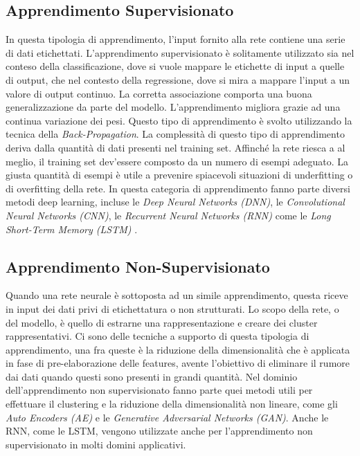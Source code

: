 \subsection{Apprendimento Supervisionato}
In questa tipologia di apprendimento, l'input fornito alla rete contiene una 
serie di dati etichettati. L'apprendimento supervisionato è solitamente 
utilizzato sia nel conteso della classificazione, dove  si vuole mappare le 
etichette di input a quelle di output, che nel contesto della regressione, 
dove si mira a mappare l'input a un valore di output continuo. La corretta 
associazione comporta una buona generalizzazione da parte del modello. 
L'apprendimento migliora grazie ad una continua variazione dei pesi. Questo 
tipo di apprendimento è svolto utilizzando la tecnica della \emph{Back-Propagation}. 
La complessità di questo tipo di apprendimento deriva dalla quantità di dati 
presenti nel training set. Affinché la rete riesca a  al meglio, il training set 
dev'essere composto da un numero di esempi adeguato. La giusta quantità di 
esempi è utile a prevenire spiacevoli situazioni di underfitting o di overfitting 
della rete. In questa categoria di apprendimento fanno parte diversi metodi 
deep learning, incluse le \emph{Deep Neural Networks (DNN)}, le \emph{Convolutional 
Neural Networks (CNN)}, le \emph{Recurrent Neural Networks (RNN)} come le \emph{Long 
Short-Term Memory (LSTM)} \cite{LSTM}.

\subsection{Apprendimento Non-Supervisionato}
Quando una rete neurale è sottoposta ad un simile apprendimento, questa 
riceve in input dei dati privi di etichettatura o non strutturati. Lo scopo 
della rete, o del modello, è quello di estrarne una rappresentazione e creare 
dei cluster rappresentativi. Ci sono delle tecniche a supporto di questa 
tipologia di apprendimento, una fra queste è la riduzione della dimensionalità 
che è applicata in fase di pre-elaborazione delle features, avente l'obiettivo di 
eliminare il rumore dai dati quando questi sono presenti in grandi quantità. 
Nel dominio dell'apprendimento non supervisionato fanno parte quei metodi 
utili per effettuare il clustering e la riduzione della dimensionalità non lineare, 
come gli \emph{Auto Encoders (AE)} e le \emph{Generative Adversarial Networks (GAN)}. 
Anche le RNN, come le LSTM, vengono utilizzate anche per l'apprendimento 
non supervisionato in molti domini applicativi.  

